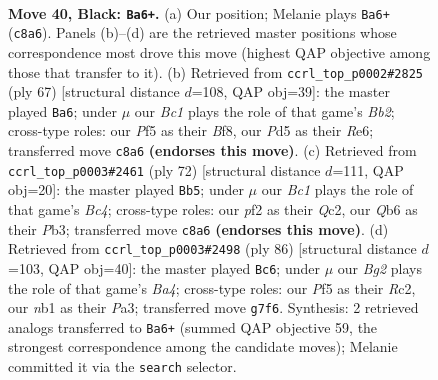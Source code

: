 \documentclass[11pt]{article}
\begin{document}
\clearpage

\begin{figure}[p]\centering
\begin{subfigure}{0.46\textwidth}\centering
\resizebox{\linewidth}{!}{%
\newchessgame
\chessboard[
  setfen={r1b1k3/6bp/1q2p3/p2p1pB1/P2p1Q1P/5N2/1n3P2/RNR2K2 b - - 1 40},
  showmover=false,
  pgfstyle=straightmove, color=movearrow, markmove={c8-a6}
]}
\caption{}
\end{subfigure}\hfill
\begin{subfigure}{0.46\textwidth}\centering
\resizebox{\linewidth}{!}{%
\newchessgame
\chessboard[
  setfen={5bk1/qb4p1/3nrpNp/2pN3Q/p1P2P2/7P/PR4PK/B7 b - - 3 34},
  showmover=false,
  pgfstyle=straightmove, color=movearrow, markmove={b7-a6}
]}
\caption{}
\end{subfigure}
\\[4pt]
\begin{subfigure}{0.46\textwidth}\centering
\resizebox{\linewidth}{!}{%
\newchessgame
\chessboard[
  setfen={3qr1k1/5pb1/R2p3p/2pPnPp1/2B1P3/1PB4P/2Q2P2/7K w - - 1 37},
  showmover=false,
  pgfstyle=straightmove, color=movearrow, markmove={c4-b5}
]}
\caption{}
\end{subfigure}\hfill
\begin{subfigure}{0.46\textwidth}\centering
\resizebox{\linewidth}{!}{%
\newchessgame
\chessboard[
  setfen={1rrq2k1/5ppp/3p1bn1/3P4/BB2PP2/P3Q3/2R5/5R1K w - - 3 44},
  showmover=false,
  pgfstyle=straightmove, color=movearrow, markmove={a4-c6}
]}
\caption{}
\end{subfigure}
\caption{\textbf{Move 40, Black: \texttt{Ba6+}.} (a) Our position; Melanie plays \texttt{Ba6+} (\texttt{c8a6}). Panels (b)--(d) are the retrieved master positions whose correspondence most drove this move (highest QAP objective among those that transfer to it). (b) Retrieved from \texttt{ccrl\_top\_p0002\#2825} (ply 67) [structural distance $d$=108, QAP obj=39]: the master played \texttt{Ba6}; under $\mu$ our \emph{Bc1} plays the role of that game's \emph{Bb2}; cross-type roles: our \emph{P}f5 as their \emph{B}f8, our \emph{P}d5 as their \emph{R}e6; transferred move \texttt{c8a6} \textbf{(endorses this move)}. (c) Retrieved from \texttt{ccrl\_top\_p0003\#2461} (ply 72) [structural distance $d$=111, QAP obj=20]: the master played \texttt{Bb5}; under $\mu$ our \emph{Bc1} plays the role of that game's \emph{Bc4}; cross-type roles: our \emph{p}f2 as their \emph{Q}c2, our \emph{Q}b6 as their \emph{P}b3; transferred move \texttt{c8a6} \textbf{(endorses this move)}. (d) Retrieved from \texttt{ccrl\_top\_p0003\#2498} (ply 86) [structural distance $d$=103, QAP obj=40]: the master played \texttt{Bc6}; under $\mu$ our \emph{Bg2} plays the role of that game's \emph{Ba4}; cross-type roles: our \emph{P}f5 as their \emph{R}c2, our \emph{n}b1 as their \emph{P}a3; transferred move \texttt{g7f6}. Synthesis: 2 retrieved analogs transferred to \texttt{Ba6+} (summed QAP objective 59, the strongest correspondence among the candidate moves); Melanie committed it via the \texttt{search} selector.}
\label{fig:thought-m79}
\end{figure}
\end{document}
